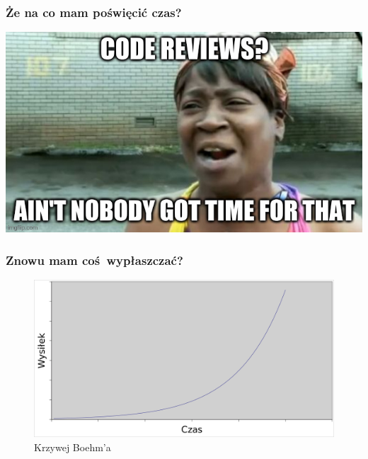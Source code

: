 \documentclass[xcolor=dvipsnames]{beamer}%
\begin{document}
\begin{frame}
	\frametitle{Że na co mam poświęcić czas?}
	\includegraphics[width=\textwidth,height=\textheight,keepaspectratio]{figure/no_time.jpg}
\end{frame}

\begin{frame}
	\frametitle{Znowu mam coś wypłaszczać?}
	\centering \begin{figure}
		\includegraphics[width=\textwidth,height=\textheight,keepaspectratio]{figure/boehm_curve.png}
		\caption{Krzywej Boehm'a}
	\end{figure}
\end{frame}
\end{document}
